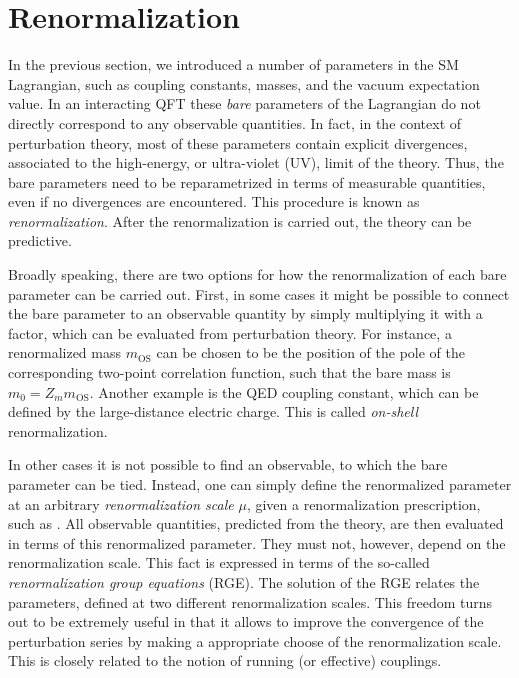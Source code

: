 \section{Renormalization}
\label{Renormalization}
\label{sec:runcoup}


In the previous section, we introduced a number of parameters in the SM Lagrangian, such as coupling constants, masses, and the vacuum expectation value.
In an interacting QFT these \emph{bare} parameters of the Lagrangian do not directly correspond to any observable quantities.
In fact, in the context of perturbation theory, most of these parameters contain explicit divergences,
associated to the high-energy, or ultra-violet (UV), limit of the theory.
Thus, the bare parameters need to be reparametrized in terms of measurable quantities,
even if no divergences are encountered.
This procedure is known as \emph{renormalization}.
After the renormalization is carried out, the theory can be predictive.

Broadly speaking, there are two options for how the renormalization of each bare parameter can be carried out.
First, in some cases it might be possible to connect the bare parameter to an observable quantity by simply multiplying it with a factor, which can be evaluated from perturbation theory.
For instance, a renormalized mass $m_\text{OS}$ can be chosen to be the position of the pole of the corresponding two-point correlation function,
such that the bare mass is 
$
  m_0 = Z_m m_\text{OS}.
$
Another example is the QED coupling constant, which can be defined by the large-distance electric charge.
This is called \emph{on-shell} renormalization.

In other cases it is not possible to find an observable, to which the bare parameter can be tied.
Instead, one can simply define the renormalized parameter at an arbitrary \emph{renormalization scale} $\mu$, given a renormalization prescription, such as \MSbar.
All observable quantities, predicted from the theory, are then evaluated in terms of this renormalized parameter.
They must not, however, depend on the renormalization scale.
This fact is expressed in terms of the so-called \emph{renormalization group equations} (RGE).
The solution of the RGE relates the parameters, defined at two different renormalization scales.
This freedom turns out to be extremely useful in that it allows to improve the convergence of the perturbation series
by making a appropriate choose of the renormalization scale.
This is closely related to the notion of running (or effective) couplings.

